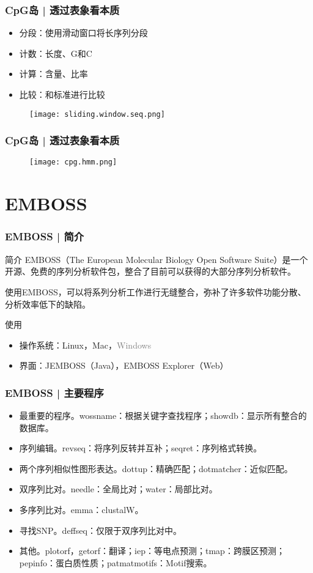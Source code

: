 \begin{frame}
  \frametitle{CpG岛 | 透过表象看本质}
  \begin{itemize}
    \item 分段：使用滑动窗口将长序列分段
    \item 计数：长度、G和C
    \item 计算：含量、比率
    \item 比较：和标准进行比较
  \end{itemize}
  \begin{figure}
    \centering
    \texttt{[image: sliding.window.seq.png]}
  \end{figure}
\end{frame}

\begin{frame}
  \frametitle{CpG岛 | 透过表象看本质}
  \begin{figure}
    \centering
    \texttt{[image: cpg.hmm.png]}
  \end{figure}
\end{frame}

\section{EMBOSS}
\begin{frame}
  \frametitle{EMBOSS | 简介}
  \begin{block}{简介}
    EMBOSS（The European Molecular Biology Open Software Suite）是一个开源、免费的序列分析软件包，整合了目前可以获得的大部分序列分析软件。

    使用EMBOSS，可以将系列分析工作进行无缝整合，弥补了许多软件功能分散、分析效率低下的缺陷。
  \end{block}
  \begin{block}{使用}
    \begin{itemize}
      \item 操作系统：Linux，Mac，\textcolor{gray}{Windows}
      \item 界面：JEMBOSS（Java），EMBOSS Explorer（Web）
    \end{itemize}
  \end{block}
\end{frame}

\begin{frame}
  \frametitle{EMBOSS | 主要程序}
  \begin{itemize}
    \item 最重要的程序。wossname：根据关键字查找程序；showdb：显示所有整合的数据库。
    \item 序列编辑。revseq：将序列反转并互补；seqret：序列格式转换。
    \item 两个序列相似性图形表达。dottup：精确匹配；dotmatcher：近似匹配。
    \item 双序列比对。needle：全局比对；water：局部比对。
    \item 多序列比对。emma：clustalW。
    \item 寻找SNP。deffseq：仅限于双序列比对中。
    \item 其他。plotorf，getorf：翻译；iep：等电点预测；tmap：跨膜区预测；pepinfo：蛋白质性质；patmatmotifs：Motif搜索。
  \end{itemize}
\end{frame}

